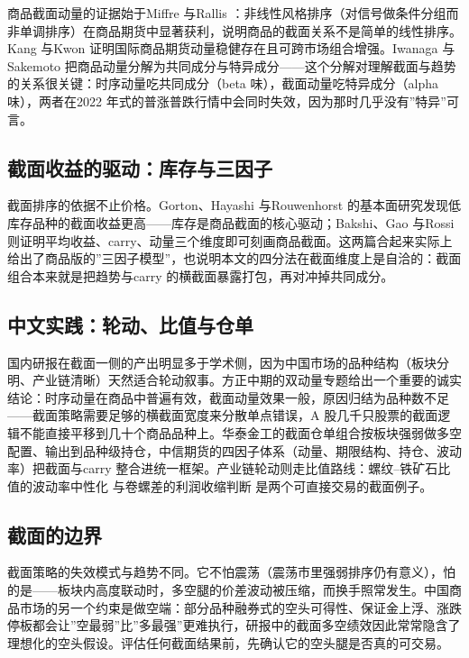 \documentclass[12pt,a4paper]{ctexart}
\begin{document}
商品截面动量的证据始于Miffre 与Rallis \cite{61}：非线性风格排序（对信号做条件分组而非单调排序）在商品期货中显著获利，说明商品的截面关系不是简单的线性排序。Kang 与Kwon 证明国际商品期货动量稳健存在且可跨市场组合增强\cite{62}。Iwanaga 与Sakemoto 把商品动量分解为共同成分与特异成分\cite{63}——这个分解对理解截面与趋势的关系很关键：时序动量吃共同成分（beta 味），截面动量吃特异成分（alpha 味），两者在2022 年式的普涨普跌行情中会同时失效，因为那时几乎没有”\hspace{0.3em}特异”\hspace{0.3em}可言。


\subsection{截面收益的驱动：库存与三因子}

截面排序的依据不止价格。Gorton、Hayashi 与Rouwenhorst 的基本面研究发现低库存品种的截面收益更高——库存是商品截面的核心驱动\cite{64}；Bakshi、Gao 与Rossi 则证明平均收益、carry、动量三个维度即可刻画商品截面\cite{65}。这两篇合起来实际上给出了商品版的”\hspace{0.3em}三因子模型”，也说明本文的四分法在截面维度上是自洽的：截面组合本来就是把趋势与carry 的横截面暴露打包，再对冲掉共同成分。


\subsection{中文实践：轮动、比值与仓单}

国内研报在截面一侧的产出明显多于学术侧，因为中国市场的品种结构（板块分明、产业链清晰）天然适合轮动叙事。方正中期的双动量专题给出一个重要的诚实结论：时序动量在商品中普遍有效，截面动量效果一般，原因归结为品种数不足\cite{66}——截面策略需要足够的横截面宽度来分散单点错误，A 股几千只股票的截面逻辑不能直接平移到几十个商品品种上。华泰金工的截面仓单组合按板块强弱做多空配置、输出到品种级持仓\cite{67}，中信期货的四因子体系（动量、期限结构、持仓、波动率）把截面与carry 整合进统一框架\cite{25}。产业链轮动则走比值路线：螺纹–铁矿石比值的波动率中性化\cite{68} 与卷螺差的利润收缩判断\cite{69} 是两个可直接交易的截面例子。


\subsection{截面的边界}

截面策略的失效模式与趋势不同。它不怕震荡（震荡市里强弱排序仍有意义），怕的是——板块内高度联动时，多空腿的价差波动被压缩，而换手照常发生。中国商品市场的另一个约束是做空端：部分品种融券式的空头可得性、保证金上浮、涨跌停板都会让”\hspace{0.3em}空最弱”\hspace{0.3em}比”\hspace{0.3em}多最强”\hspace{0.3em}更难执行，研报中的截面多空绩效因此常常隐含了理想化的空头假设。评估任何截面结果前，先确认它的空头腿是否真的可交易。
\end{document}
